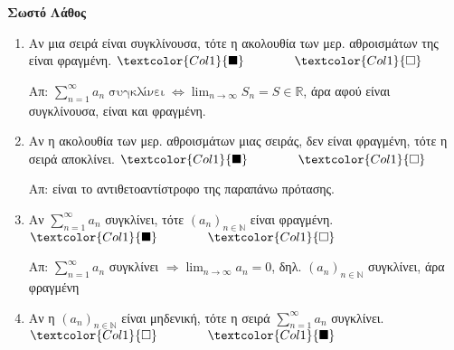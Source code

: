 



\pagestyle{askhseis}




\begin{center}
  \minibox{\large\bfseries \textcolor{Col2}{Σειρές (Ερωτήσεις)}}
\end{center}


\vspace{\baselineskip}

\hfill \textcolor{Col1}{\textbf{Σωστό}} \quad \textcolor{Col1}{\textbf{Λάθος}}
\begin{enumerate}[itemsep=.5\baselineskip]
  \item \textcolor{Col1}{Αν μια σειρά είναι συγκλίνουσα, τότε η ακολουθία των μερ.
    αθροισμάτων της είναι φραγμένη}. 
    \hfill $\textcolor{Col1}{\blacksquare} \qquad \qquad \textcolor{Col1}{\square}$

    Απ: $ \sum_{n=1}^{\infty} a_{n} \; \text{συγκλίνει} \; \Leftrightarrow \lim_{n \to
    \infty} S_{n} = S \in \mathbb{R} $, άρα αφού είναι συγκλίνουσα, είναι και φραγμένη. 

  \item \textcolor{Col1}{Αν η ακολουθία των μερ. αθροισμάτων μιας σειράς, δεν είναι
    φραγμένη, τότε η σειρά αποκλίνει}.
    \hfill $\textcolor{Col1}{\blacksquare} \qquad \qquad \textcolor{Col1}{\square}$

    Απ: είναι το αντιθετοαντίστροφο της παραπάνω πρότασης.

  \item \textcolor{Col1}{Αν $ \sum_{n=1}^{\infty} a_{n} $ συγκλίνει, τότε 
      $ {(a_{n})}_{n \in \mathbb{N}} $ είναι φραγμένη}.
    \hfill $\textcolor{Col1}{\blacksquare} \qquad \qquad \textcolor{Col1}{\square}$

    Απ: $ \sum_{n=1}^{\infty} a_{n} $ συγκλίνει $ \Rightarrow \lim_{n \to \infty} a_{n} =
    0 $, δηλ. $ {(a_{n})}_{n \in \mathbb{N}} $ συγκλίνει, άρα φραγμένη

  \item \textcolor{Col1}{Αν η $ {(a_{n})}_{n \in \mathbb{N}} $ είναι μηδενική, τότε η
    σειρά $ \sum_{n=1}^{\infty} a_{n} $ συγκλίνει}.
    \hfill $\textcolor{Col1}{\square} \qquad \qquad \textcolor{Col1}{\blacksquare}$


\end{enumerate}
